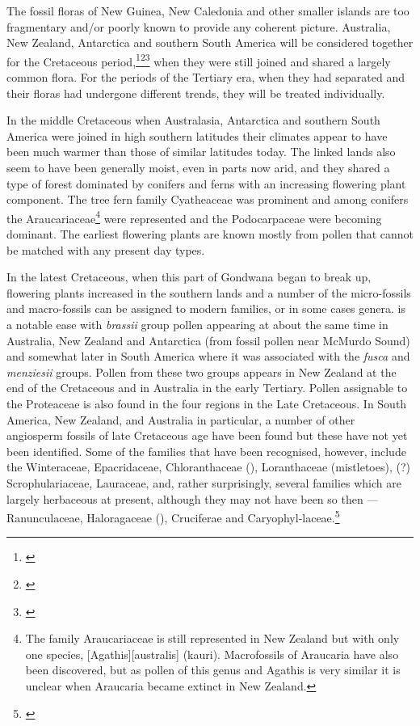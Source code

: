 The fossil floras of New Guinea, New Caledonia and other smaller islands are too fragmentary and/or poorly known to provide any coherent picture.
Australia, New Zealand, Antarctica and southern South America will be considered together for the Cretaceous period,\footnote{\cite{mildenhall1980new}}\footnote{\cite{wace1965vascular}}\footnote{\cite{dettmann1981cretaceous}} when they were still joined and shared a largely common flora.
For the periods of the Tertiary era, when they had separated and their floras had undergone different trends, they will be treated individually.

In the middle Cretaceous when Australasia, Antarctica and southern South America were joined in high southern latitudes their climates appear to have been much warmer than those of similar latitudes today.
The linked lands also seem to have been generally moist, even in parts now arid, and they shared a type of forest dominated by conifers and ferns with an increasing flowering plant component.
The tree fern family Cyatheaceae was prominent and among conifers the Araucariaceae\footnote{The family Araucariaceae is still represented in New Zealand but with only one species, [Agathis][australis] (kauri). Macrofossils of Araucaria have also been discovered, but as pollen of this genus and Agathis is very similar it is unclear when Araucaria became extinct in New Zealand.} were represented and the Podocarpaceae were becoming dominant.
The earliest flowering plants are known mostly from pollen that cannot be matched with any present day types.

In the latest Cretaceous, when this part of Gondwana began to break up, flowering plants increased in the southern lands and a number of the micro-fossils and macro-fossils can be assigned to modern families, or in some cases genera.  is a notable ease with \emph{brassii} group pollen appearing at about the same time in Australia, New Zealand and Antarctica (from fossil pollen near McMurdo Sound) and somewhat later in South America where it was associated with the \emph{fusca} and \emph{menziesii} groups.
Pollen from these two groups appears in New Zealand at the end of the Cretaceous and in Australia in the early Tertiary.
Pollen assignable to the Proteaceae is also found in the four regions in the Late Cretaceous.
In South America, New Zealand, and Australia in particular, a number of other angiosperm fossils of late Cretaceous age have been found but these have not yet been identified.
Some of the families that have been recognised, however, include the Winteraceae, Epacridaceae, Chloranthaceae (), Loranthaceae (mistletoes), (?) Scrophulariaceae, Lauraceae, and, rather surprisingly, several families which are largely herbaceous at present, although they may not have been so then --- Ranunculaceae, Haloragaceae (), Cruciferae and Caryophyl-laceae.\footnote{\cite{mildenhall1980new}}

